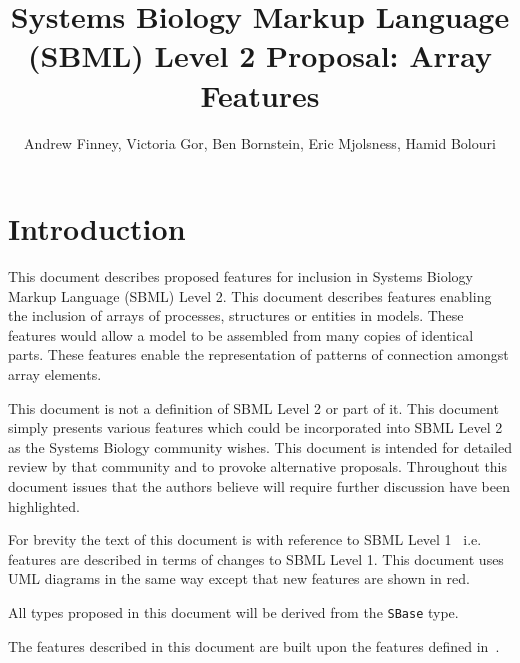 \documentclass{cekarticle}
\begin{document}

\title{Systems Biology Markup Language (SBML) Level 2 Proposal: Array Features}

\author{Andrew Finney, Victoria Gor, Ben Bornstein, Eric Mjolsness, Hamid Bolouri}


\maketitlepage

\section{Introduction}
\label{sec:introduction}

This document describes proposed features for inclusion in
Systems Biology Markup Language (SBML) Level 2. This document
describes features enabling the inclusion of arrays of processes,
structures or entities in models.  These features would allow a
model to be assembled from many copies of identical parts.  These
features enable the representation of patterns of connection
amongst array elements.

This document is not a definition of SBML Level 2 or part of it.
This document simply presents various features which could be
incorporated into SBML Level 2 as the Systems Biology community
wishes.  This document is intended for detailed review by that
community and to provoke alternative proposals.  Throughout this
document issues that the authors believe will require further
discussion have been highlighted.

For brevity the text of this document is with reference to SBML
Level 1~\citep{hucka:2001} i.e. features are described in terms
of changes to SBML Level 1.  This document uses UML diagrams in
the same way except that new features are shown in red.

All types proposed in this document will be derived from the
\texttt{SBase} type.

The features described in this document are built upon the
features defined in~\citet{finney:2002c}.
\end{document}
